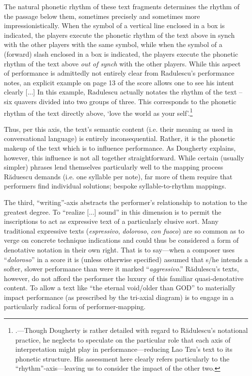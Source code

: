         \begin{smallquote}
            The natural phonetic rhythm of these text fragments determines the rhythm of the passage below them, sometimes precisely and sometimes more impressionistically. When the symbol of a vertical line enclosed in a box is indicated, the players execute the phonetic rhythm of the text above in synch with the other players with the same symbol, while when the symbol of a (forward) slash enclosed in a box is indicated, the players execute the phonetic rhythm of the text above \textit{out of synch} with the other players. While this aspect of performance is admittedly not entirely clear from Radulescu's performance notes, an explicit example on page 13 of the score allows one to see his intent clearly [...] In this example, Radulescu actually notates the rhythm of the text -- six quavers divided into two groups of three. This corresponds to the phonetic rhythm of the text directly above, `love the world as your self'.\footnote{\autocite[37]{Dougherty_2014}.---Though Dougherty is rather detailed with regard to R\u{a}dulescu's notational practice, he neglects to speculate on the particular role that each axis of interpretation might play in performance---reducing Lao Tzu's text to its phonetic structure. His assessment here clearly refers particularly to the ``rhythm''-axis---leaving us to consider the impact of the other two.}
        \end{smallquote}

        \noindent Thus, per this axis, the text's semantic content (i.e. their meaning as used in conversational language) is entirely inconsequential. Rather, it is the phonetic makeup of the text which is to influence performance. As Dougherty explains, however, this influence is not all together straightforward. While certain (usually simpler) phrases lend themselves particularly well to the mapping process R\u{a}duescu demands (i.e. one syllable per note), far more of them require that performers find individual solutions; bespoke syllable-to-rhythm mappings.

        The third, ``writing''-axis abstracts the performer's relationship to notation to the greatest degree. To ``realize [...] sound'' in this dimension is to permit the inscriptions to act as expressive text of a particularly elusive sort. Many traditional expressive texts (\textit{espressivo}, \textit{doloroso}, \textit{con fuoco}) are so common as to verge on concrete technique indications and could thus be considered a form of denotative notation in their own right. That is to say---when a composer uses ``\textit{doloroso}'' in a score it is (unless otherwise specified) assumed that s/he intends a softer, slower performance than were it marked ``\textit{aggressivo}.'' R\u{a}dulescu's texts, however, do not afford the performer the luxury of this familiar quasi-denotative content. To allow a text like ``\textsf{the eternal void/older than GOD}''\autocite[4]{Radulescu_1993} to materially impact performance (as prescribed by the tri-axial diagram) is to engage in a particularly radical form of performer-mapping.
        
